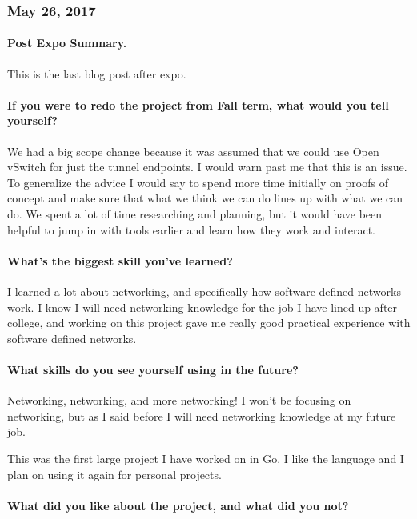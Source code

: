 \documentclass[10pt,onecolumn,journal,draftclsnofoot]{IEEEtran}
\begin{document}
\subsubsection{May 26, 2017} 

\paragraph{Post Expo Summary.} 

This is the last blog post after expo.

\paragraph{If you were to redo the project from Fall term, what would
you tell
yourself?} 

We had a big scope change because it was assumed that we could use Open
vSwitch for just the tunnel endpoints. I would warn past me that this is
an issue. To generalize the advice I would say to spend more time
initially on proofs of concept and make sure that what we think we can
do lines up with what we can do. We spent a lot of time researching and
planning, but it would have been helpful to jump in with tools earlier
and learn how they work and interact.

\paragraph{What's the biggest skill you've
learned?} 

I learned a lot about networking, and specifically how software defined
networks work. I know I will need networking knowledge for the job I
have lined up after college, and working on this project gave me really
good practical experience with software defined networks.

\paragraph{What skills do you see yourself using in the
future?} 

Networking, networking, and more networking! I won't be focusing on
networking, but as I said before I will need networking knowledge at my
future job.

This was the first large project I have worked on in Go. I like the
language and I plan on using it again for personal projects.

\paragraph{What did you like about the project, and what did you
not?} 
\end{document}
